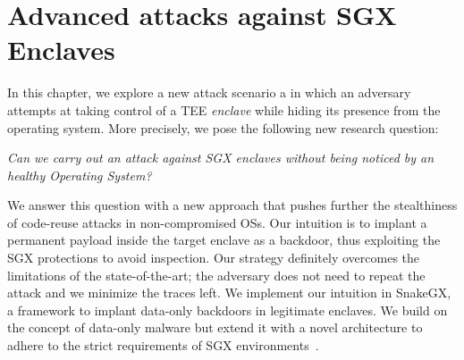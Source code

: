 \chapter{Advanced attacks against SGX Enclaves}
\label{chp:advanced-threats} 

%

In this chapter, we explore a new attack scenario a in which an adversary 
attempts at taking control of a TEE \emph{enclave} while hiding its presence 
from the operating system.
More precisely, we pose the following new research question:

\emph{Can we carry out an attack against SGX enclaves without being 
	noticed by an healthy Operating System?}

We answer this question with a new approach that pushes further the 
stealthiness of code-reuse attacks in non-compromised OSs.
Our intuition is to implant a permanent payload inside the target 
enclave as a backdoor, thus exploiting the SGX protections to avoid 
inspection.
%
Our strategy definitely overcomes the limitations of the state-of-the-art;
the adversary does not need to repeat the attack and we minimize the 
traces left.
%
We implement our intuition in SnakeGX, a framework to implant
data-only backdoors in legitimate enclaves. 
We build on the concept of data-only malware but extend it with a novel 
architecture to adhere to the strict requirements of SGX 
environments~\citep{vogl2014persistent}.

